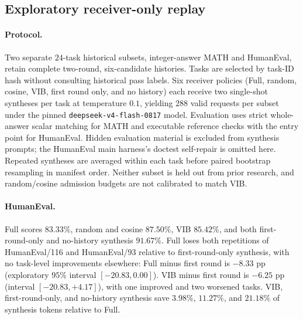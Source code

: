 \documentclass[11pt,twoside,twocolumn,letterpaper]{article}
\begin{document}
\subsection{Exploratory receiver-only replay}\label{app:receiver_replay}
\paragraph{Protocol.} Two separate $24$-task historical subsets, integer-answer MATH and HumanEval, retain complete two-round, six-candidate histories. Tasks are selected by task-ID hash without consulting historical pass labels. Six receiver policies (Full, random, cosine, VIB, first round only, and no history) each receive two single-shot syntheses per task at temperature $0.1$, yielding $288$ valid requests per subset under the pinned \texttt{deepseek-v4-flash-0817} model. Evaluation uses strict whole-answer scalar matching for MATH and executable reference checks with the entry point for HumanEval. Hidden evaluation material is excluded from synthesis prompts; the HumanEval main harness's doctest self-repair is omitted here. Repeated syntheses are averaged within each task before paired bootstrap resampling in manifest order. Neither subset is held out from prior research, and random/cosine admission budgets are not calibrated to match VIB.

\paragraph{HumanEval.} Full scores $83.33\%$, random and cosine $87.50\%$, VIB $85.42\%$, and both first-round-only and no-history synthesis $91.67\%$. Full loses both repetitions of HumanEval/116 and HumanEval/93 relative to first-round-only synthesis, with no task-level improvements elsewhere: Full minus first round is $-8.33$ pp (exploratory $95\%$ interval $[-20.83,0.00]$). VIB minus first round is $-6.25$ pp (interval $[-20.83,+4.17]$), with one improved and two worsened tasks. VIB, first-round-only, and no-history synthesis save $3.98\%$, $11.27\%$, and $21.18\%$ of synthesis tokens relative to Full.
\end{document}
